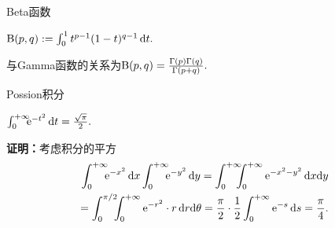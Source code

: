 \begin{example}{Beta函数}{}
	\begin{center}
		$\text B(p,q):=\int_0^1t^{p-1}(1-t)^{q-1}\d t.$ %
	\end{center}
	与Gamma函数的关系为$\text B(p,q)=\frac{\Gamma(p)\Gamma(q)}{\Gamma(p+q)}.$
\end{example}
\begin{example}{Possion积分}{}
	\begin{center}
		$\int\zti\bs5\e{-t^2}\d t=\frac{\sqrt\pi}2.$
	\end{center}
	\textbf{证明：}考虑积分的平方
	\begin{align*}
		\int\zti\bs5\e{-x^2}\d x\int\zti\bs5\e{-y^2}\d y=\int\zti\bs7\int\zti\e{-x^2-y^2}\d x\nd y \\
		=\int_0^{\pi/2}\bs5\int\zti\e{-r^2}\cdot r\d r\nd\theta=\frac\pi{2}\cdot\frac12\int\zti\e{-s}\d s=\frac\pi{4}.
	\end{align*}
	\iffalse
		由$\ex>0,\forall x\in\RR$
		\[\intt_A\e{-x^2-y^2}\d x\nd y\leqslant\intt_B\e{-x^2-y^2}\d x\nd y\leqslant\intt_C\e{-x^2-y^2}\d x\nd y\]
		其中
		\begin{align*}
			B & =\{(x,y)~|~0\leqslant x\leqslant R,0\leqslant y\leqslant R\}, \\
			A & =\{(x,y)~|~x^2+y^2\leqslant R^2,x\geqslant 0,y\geqslant 0\},  \\
			C & =\{(x,y)~|~x^2+y^2\leqslant 2R^2,x\geqslant 0,y\geqslant 0\}.
		\end{align*}
		又
		\begin{align*}
			\intt_A\e{-x^2-y^2}\d x\nd y & =\int_0^{\pi/2}\bs7\int_0^R\e{-\rho^2}\rho\d\rho\d\varphi=\frac{\pi}4\left(1-\e{-R^2}\right), \\
			\intt_B\e{-x^2-y^2}\d x\nd y & =\int_0^R\bs7\int_0^R\e{-x^2}\e{-y^2}\d x\nd y=\left(\int_0^R\e{-t^2}\d t\right)^2,          \\
			\intt_C\e{-x^2-y^2}\d x\nd y & =\frac{\pi}4\left(1-\e{-2R^2}\right).
		\end{align*}
		当$R\to+\infty$，即得$\int\zti\bs5\e{-t^2}\d t=\frac{\sqrt\pi}2$.
	\fi
\end{example}
